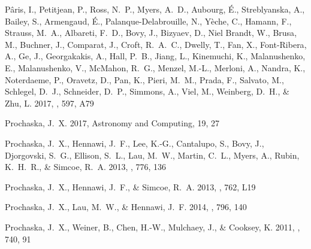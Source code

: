 \documentclass[iop]{emulateapj}
\begin{document}
\begin{thebibliography}{54}
{P{\^a}ris}, I., {Petitjean}, P., {Ross}, N.~P., {Myers}, A.~D., {Aubourg},
  {\'E}., {Streblyanska}, A., {Bailey}, S., {Armengaud}, {\'E}.,
  {Palanque-Delabrouille}, N., {Y{\`e}che}, C., {Hamann}, F., {Strauss}, M.~A.,
  {Albareti}, F.~D., {Bovy}, J., {Bizyaev}, D., {Niel Brandt}, W., {Brusa}, M.,
  {Buchner}, J., {Comparat}, J., {Croft}, R.~A.~C., {Dwelly}, T., {Fan}, X.,
  {Font-Ribera}, A., {Ge}, J., {Georgakakis}, A., {Hall}, P.~B., {Jiang}, L.,
  {Kinemuchi}, K., {Malanushenko}, E., {Malanushenko}, V., {McMahon}, R.~G.,
  {Menzel}, M.-L., {Merloni}, A., {Nandra}, K., {Noterdaeme}, P., {Oravetz},
  D., {Pan}, K., {Pieri}, M.~M., {Prada}, F., {Salvato}, M., {Schlegel}, D.~J.,
  {Schneider}, D.~P., {Simmons}, A., {Viel}, M., {Weinberg}, D.~H., \& {Zhu},
  L. 2017, \aap, 597, A79

{Prochaska}, J.~X. 2017, Astronomy and Computing, 19, 27

{Prochaska}, J.~X., {Hennawi}, J.~F., {Lee}, K.-G., {Cantalupo}, S., {Bovy},
  J., {Djorgovski}, S.~G., {Ellison}, S.~L., {Lau}, M.~W., {Martin}, C.~L.,
  {Myers}, A., {Rubin}, K.~H.~R., \& {Simcoe}, R.~A. 2013{}, \apj,
  776, 136

{Prochaska}, J.~X., {Hennawi}, J.~F., \& {Simcoe}, R.~A. 2013{},
  \apjl, 762, L19

{Prochaska}, J.~X., {Lau}, M.~W., \& {Hennawi}, J.~F. 2014, \apj, 796, 140

{Prochaska}, J.~X., {Weiner}, B., {Chen}, H.-W., {Mulchaey}, J., \& {Cooksey},
  K. 2011, \apj, 740, 91


\end{thebibliography}
\end{document}
